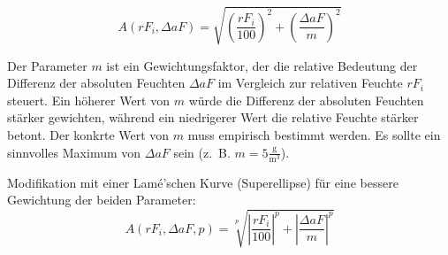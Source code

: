 \begin{equation}
    A(rF_i, \Delta aF) 
    = 
    \sqrt{\left(\frac{rF_i}{100}\right)^2 + \left(\frac{\Delta aF}{m}\right)^2}
\end{equation}

Der Parameter $m$ ist ein Gewichtungsfaktor, der die relative Bedeutung der Differenz der absoluten Feuchten $\Delta aF$ im Vergleich zur relativen Feuchte $rF_i$ steuert. Ein höherer Wert von $m$ würde die Differenz der absoluten Feuchten stärker gewichten, während ein niedrigerer Wert die relative Feuchte stärker betont. Der konkrte Wert von $m$ muss empirisch bestimmt werden. Es sollte ein sinnvolles Maximum von $\Delta aF$ sein (z.\ B. $m = 5\frac{\mathrm{g}}{\mathrm{m}^3}$).  

Modifikation mit einer Lamé'schen Kurve (Superellipse) für eine bessere Gewichtung der beiden Parameter:
\begin{equation}
    A(rF_i, \Delta aF, p) 
    = 
    \sqrt[p]{\left|\frac{rF_i}{100}\right|^{p}+\left|\frac{\Delta aF}{m}\right|^{p}}
\end{equation}


